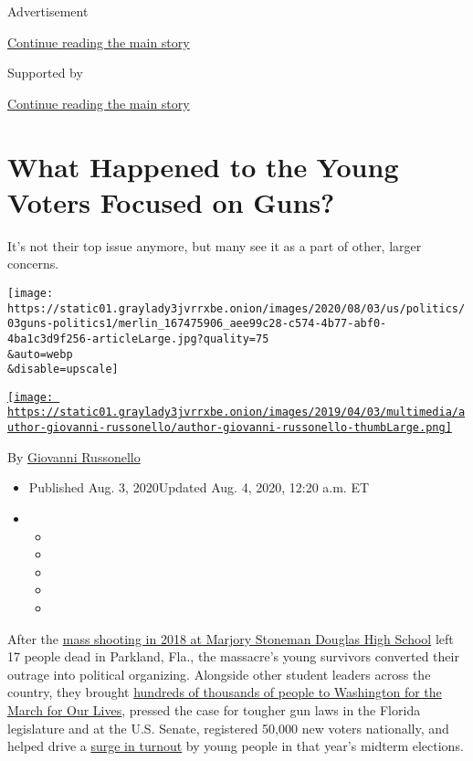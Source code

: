 Advertisement

\protect\hyperlink{after-top}{Continue reading the main story}

Supported by

\protect\hyperlink{after-sponsor}{Continue reading the main story}

\hypertarget{what-happened-to-the-young-voters-focused-on-guns}{%
\section{What Happened to the Young Voters Focused on
Guns?}\label{what-happened-to-the-young-voters-focused-on-guns}}

It's not their top issue anymore, but many see it as a part of other,
larger concerns.

\texttt{[image: https://static01.graylady3jvrrxbe.onion/images/2020/08/03/us/politics/03guns-politics1/merlin\_167475906\_aee99c28-c574-4b77-abf0-4ba1c3d9f256-articleLarge.jpg?quality=75\\\&auto=webp\\\&disable=upscale]}

\href{https://www.nytimes3xbfgragh.onion/by/giovanni-russonello}{\texttt{[image: https://static01.graylady3jvrrxbe.onion/images/2019/04/03/multimedia/author-giovanni-russonello/author-giovanni-russonello-thumbLarge.png]}}

By
\href{https://www.nytimes3xbfgragh.onion/by/giovanni-russonello}{Giovanni
Russonello}

\begin{itemize}
\item
  Published Aug. 3, 2020Updated Aug. 4, 2020, 12:20 a.m. ET
\item
  \begin{itemize}
  \item
  \item
  \item
  \item
  \item
  \end{itemize}
\end{itemize}

After the
\href{https://www.nytimes3xbfgragh.onion/2019/02/13/us/parkland-anniversary-marjory-stoneman-douglas.html}{mass
shooting in 2018 at Marjory Stoneman Douglas High School} left 17 people
dead in Parkland, Fla., the massacre's young survivors converted their
outrage into political organizing. Alongside other student leaders
across the country, they brought
\href{https://www.nytimes3xbfgragh.onion/2018/03/24/us/march-for-our-lives.html}{hundreds
of thousands of people to Washington for the March for Our Lives},
pressed the case for tougher gun laws in the Florida legislature and at
the U.S. Senate, registered 50,000 new voters nationally, and helped
drive a
\href{https://www.nytimes3xbfgragh.onion/2018/11/07/us/elections-gun-control-florida.html}{surge
in turnout} by young people in that year's midterm elections.


